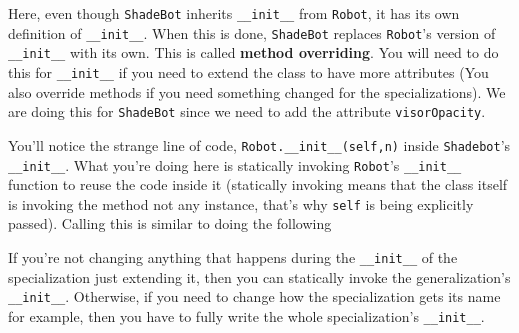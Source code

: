 Here, even though \texttt{ShadeBot} inherits \texttt{\_\_init\_\_} from
\texttt{Robot}, it has its own definition of \texttt{\_\_init\_\_}. When
this is done, \texttt{ShadeBot} replaces \texttt{Robot}'s version of
\texttt{\_\_init\_\_} with its own. This is called \textbf{method
overriding}. You will need to do this for \texttt{\_\_init\_\_} if you
need to extend the class to have more attributes (You also override
methods if you need something changed for the specializations). We are
doing this for \texttt{ShadeBot} since we need to add the attribute
\texttt{visorOpacity}.

You'll notice the strange line of code,
\texttt{Robot.\_\_init\_\_(self,n)} inside \texttt{Shadebot}'s
\texttt{\_\_init\_\_}. What you're doing here is statically invoking
\texttt{Robot}'s \texttt{\_\_init\_\_} function to reuse the code inside
it (statically invoking means that the class itself is invoking the
method not any instance, that's why \texttt{self} is being explicitly
passed). Calling this is similar to doing the following

\begin{Shaded}
\begin{Highlighting}[]
 \NormalTok{(}\NormalTok{):}
    \OperatorTok{=}
    \OperatorTok{=}
\end{Highlighting}
\end{Shaded}

If you're not changing anything that happens during the
\texttt{\_\_init\_\_} of the specialization just extending it, then you
can statically invoke the generalization's \texttt{\_\_init\_\_}.
Otherwise, if you need to change how the specialization gets its name
for example, then you have to fully write the whole specialization's
\texttt{\_\_init\_\_}.

\begin{Shaded}
\begin{Highlighting}[]
 \NormalTok{(}\NormalTok{):}
    \OperatorTok{=}  \OperatorTok{+}
    \OperatorTok{=}
\end{Highlighting}
\end{Shaded}

